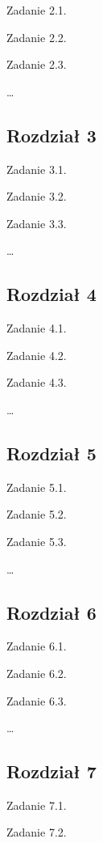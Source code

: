 \documentclass[
  letterpaper,
  DIV=11,
  numbers=noendperiod]{scrreprt}
\begin{document}
Zadanie 2.1.

Zadanie 2.2.

Zadanie 2.3.

\ldots{}

\subsection*{Rozdział 3}\label{rozdziaux142-3}

Zadanie 3.1.

Zadanie 3.2.

Zadanie 3.3.

\ldots{}

\subsection*{Rozdział 4}\label{rozdziaux142-4}

Zadanie 4.1.

Zadanie 4.2.

Zadanie 4.3.

\ldots{}

\subsection*{Rozdział 5}\label{rozdziaux142-5}

Zadanie 5.1.

Zadanie 5.2.

Zadanie 5.3.

\ldots{}

\subsection*{Rozdział 6}\label{rozdziaux142-6}

Zadanie 6.1.

Zadanie 6.2.

Zadanie 6.3.

\ldots{}

\subsection*{Rozdział 7}\label{rozdziaux142-7}

Zadanie 7.1.

Zadanie 7.2.
\end{document}
